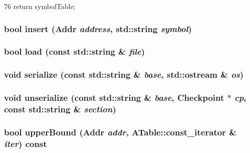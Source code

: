 \begin{DoxyCode}
76 { return symbolTable; }
\end{DoxyCode}
\hypertarget{classSymbolTable_a353cad0b34c8bd0e7e0341a8061b054d}{
\subsubsection[{insert}]{\setlength{\rightskip}{0pt plus 5cm}bool insert ({\bf Addr} {\em address}, \/  std::string {\em symbol})}}
\label{classSymbolTable_a353cad0b34c8bd0e7e0341a8061b054d}
\hypertarget{classSymbolTable_a9c68305a6794dc960db947d68839b724}{
\subsubsection[{load}]{\setlength{\rightskip}{0pt plus 5cm}bool load (const std::string \& {\em file})}}
\label{classSymbolTable_a9c68305a6794dc960db947d68839b724}
\hypertarget{classSymbolTable_ab4138b21b48e3371a8e20df72b675a88}{
\subsubsection[{serialize}]{\setlength{\rightskip}{0pt plus 5cm}void serialize (const std::string \& {\em base}, \/  std::ostream \& {\em os})}}
\label{classSymbolTable_ab4138b21b48e3371a8e20df72b675a88}
\hypertarget{classSymbolTable_a147c320e3d6506edf5587a40cd8e430d}{
\subsubsection[{unserialize}]{\setlength{\rightskip}{0pt plus 5cm}void unserialize (const std::string \& {\em base}, \/  {\bf Checkpoint} $\ast$ {\em cp}, \/  const std::string \& {\em section})}}
\label{classSymbolTable_a147c320e3d6506edf5587a40cd8e430d}
\hypertarget{classSymbolTable_a31fc93d64da60991f0126e0001eddbe0}{
\subsubsection[{upperBound}]{\setlength{\rightskip}{0pt plus 5cm}bool upperBound ({\bf Addr} {\em addr}, \/  ATable::const\_\-iterator \& {\em iter}) const}}
\label{classSymbolTable_a31fc93d64da60991f0126e0001eddbe0}



